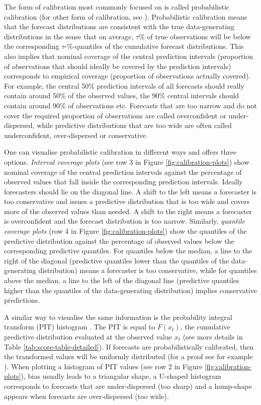 \documentclass[
]{jss}
\begin{document}
The form of calibration most commonly focused on is called probabilistic
calibration (for other form of calibration, see
\cite{gneitingProbabilisticForecastsCalibration2007}). Probabilistic
calibration means that the forecast distributions are consistent with
the true data-generating distributions in the sense that on average,
\(\tau\)\% of true observations will be below the corresponding
\(\tau\)-\%-quantiles of the cumulative forecast distributions. This
also implies that nominal coverage of the central prediction intervals
(proportion of observations that should ideally be covered by the
prediction intervals) corresponds to empirical coverage (proportion of
observations actually covered). For example, the central 50\% prediction
intervals of all forecasts should really contain around 50\% of the
observed values, the 90\% central intervals should contain around 90\%
of observations etc. Forecasts that are too narrow and do not cover the
required proportion of observations are called overconfident or
under-dispersed, while predictive distributions that are too wide are
often called underconfident, over-dispersed or conservative.

One can visualise probabilistic calibration in different ways and
 offers three options. \emph{Interval coverage plots}
(see row 3 in Figure \ref{fig:calibration-plots}) show nominal coverage
of the central prediction intervals against the percentage of observed
values that fall inside the corresponding prediction intervals. Ideally
forecasters should lie on the diagonal line. A shift to the left means a
forecaster is too conservative and issues a predictive distribution that
is too wide and covers more of the observed values than needed. A shift
to the right means a forecaster is overconfident and the forecast
distribution is too narrow. Similarly, \emph{quantile coverage plots}
(row 4 in Figure \ref{fig:calibration-plots}) show the quantiles of the
predictive distribution against the percentage of observed values below
the corresponding predictive quantiles. For quantiles below the median,
a line to the right of the diagonal (predictive quantiles lower than the
quantiles of the data-generating distribution) means a forecaster is too
conservative, while for quantiles above the median, a line to the left
of the diagonal line (predictive quantiles higher than the quantiles of
the data-generating distribution) implies conservative predictions.

A similar way to visualise the same information is the probability
integral transform (PIT) histogram
\citep{dawidPresentPositionPotential1984}. The PIT is equal to
\(F(x_t)\), the cumulative predictive distribution evaluated at the
observed value \(x_t\) (see more details in Table
\ref{tab:score-table-detailed}). If forecasts are probabilistically
calibrated, then the transformed values will be uniformly distributed
(for a proof see for example
\citet{angusProbabilityIntegralTransform1994}). When plotting a
histogram of PIT values (see row 2 in Figure
\ref{fig:calibration-plots}), bias usually leads to a triangular shape,
a U-shaped histogram corresponds to forecasts that are under-dispersed
(too sharp) and a hump-shape appears when forecasts are over-dispersed
(too wide).
\end{document}
